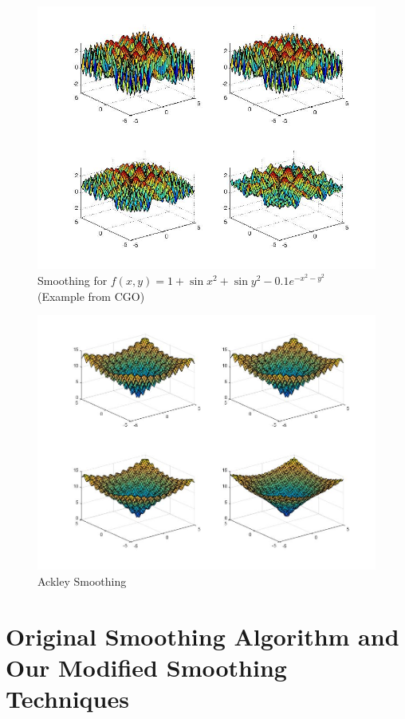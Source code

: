 \documentclass[letterpaper,12pt,titlepage,oneside,final]{book}
\begin{document}
\begin{figure}[H]
\includegraphics[scale=0.65]{smooth2.jpg}
\caption{Smoothing for $f(x,y)=1+\sin x^2+\sin y^2-0.1e^{-x^2-y^2}$ (Example from CGO)}
\end{figure}

\begin{figure}[H] 
\includegraphics[scale=0.5]{smoothackley.jpg}
\caption{Ackley Smoothing}\label{sac} 
\end{figure}

\section{Original Smoothing Algorithm and Our Modified Smoothing Techniques}
\end{document}
